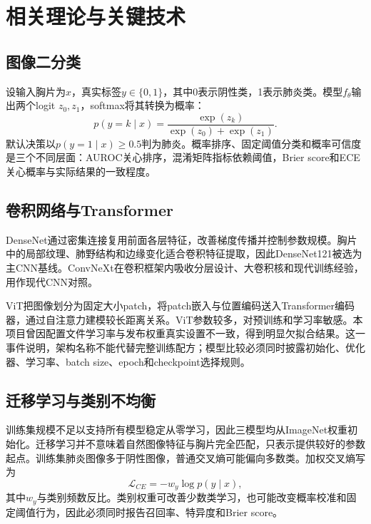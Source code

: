 \chapter{相关理论与关键技术}

\section{图像二分类}

设输入胸片为$x$，真实标签$y\in\{0,1\}$，其中0表示阴性类，1表示肺炎类。模型$f_\theta$输出两个logit $z_0,z_1$，softmax将其转换为概率：
\begin{equation}
p(y=k\mid x)=\frac{\exp(z_k)}{\exp(z_0)+\exp(z_1)}.
\end{equation}
默认决策以$p(y=1\mid x)\ge 0.5$判为肺炎。概率排序、固定阈值分类和概率可信度是三个不同层面：AUROC关心排序，混淆矩阵指标依赖阈值，Brier score和ECE关心概率与实际结果的一致程度。

\section{卷积网络与Transformer}

DenseNet通过密集连接复用前面各层特征，改善梯度传播并控制参数规模\cite{huang2017densenet}。胸片中的局部纹理、肺野结构和边缘变化适合卷积特征提取，因此DenseNet121被选为主CNN基线。ConvNeXt在卷积框架内吸收分层设计、大卷积核和现代训练经验，用作现代CNN对照\cite{liu2022convnext}。

ViT把图像划分为固定大小patch，将patch嵌入与位置编码送入Transformer编码器，通过自注意力建模较长距离关系\cite{dosovitskiy2021vit}。ViT参数较多，对预训练和学习率敏感。本项目曾因配置文件学习率与发布权重真实设置不一致，得到明显欠拟合结果。这一事件说明，架构名称不能代替完整训练配方；模型比较必须同时披露初始化、优化器、学习率、batch size、epoch和checkpoint选择规则。

\section{迁移学习与类别不均衡}

训练集规模不足以支持所有模型稳定从零学习，因此三模型均从ImageNet权重初始化。迁移学习并不意味着自然图像特征与胸片完全匹配，只表示提供较好的参数起点。训练集肺炎图像多于阴性图像，普通交叉熵可能偏向多数类。加权交叉熵写为
\begin{equation}
\mathcal{L}_{CE}=-w_y\log p(y\mid x),
\end{equation}
其中$w_y$与类别频数反比。类别权重可改善少数类学习，也可能改变概率校准和固定阈值行为，因此必须同时报告召回率、特异度和Brier score。

